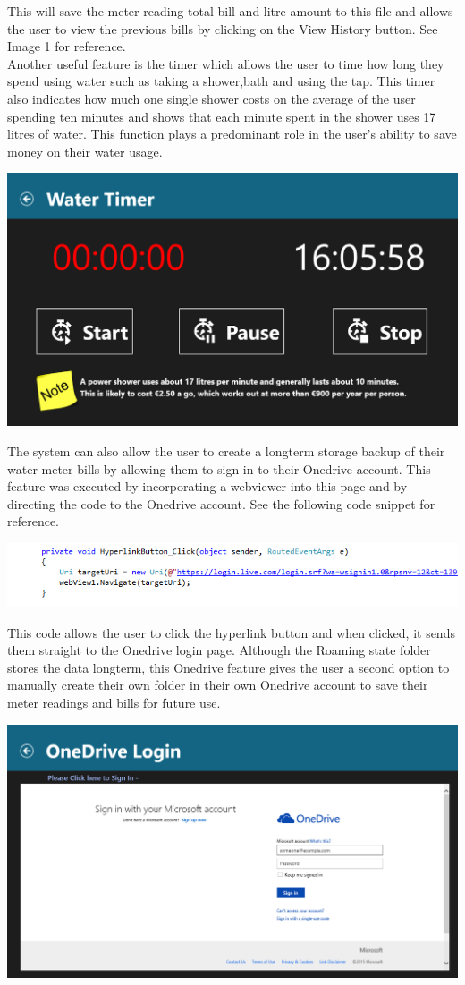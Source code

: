 \documentclass[runningheads,a4paper]{llncs}
\begin{document}
This will save the meter reading total bill and litre amount to this file and allows the user to view the previous bills by clicking on the View History button. See Image 1 for reference.\\
Another useful feature is the timer which allows the user to time how long they spend using water such as taking a shower,bath and using the tap. This timer also indicates how much one single shower costs on the average of the user spending ten minutes and shows that each minute spent in the shower uses 17 litres of water. This function plays a predominant role in the user's ability to save money on their water usage. 

\includegraphics[scale=0.2]{ScreenShotTimer}

The system can also allow the user to create a longterm storage backup of their water meter bills by allowing them to sign in to their Onedrive account. This feature was executed by incorporating a webviewer into this page and by directing the code to the Onedrive account. See the following code snippet for reference. 

\includegraphics[scale=0.7]{OneDriveCode}

This code allows the user to click the hyperlink button and when clicked, it sends them straight to the Onedrive login page. Although the Roaming state folder stores the data longterm, this Onedrive feature gives the user a second option to manually create their own folder in their own Onedrive account to save their meter readings and bills for future use.

\includegraphics[scale=0.2]{ScreenShotOnedrive}
\end{document}
